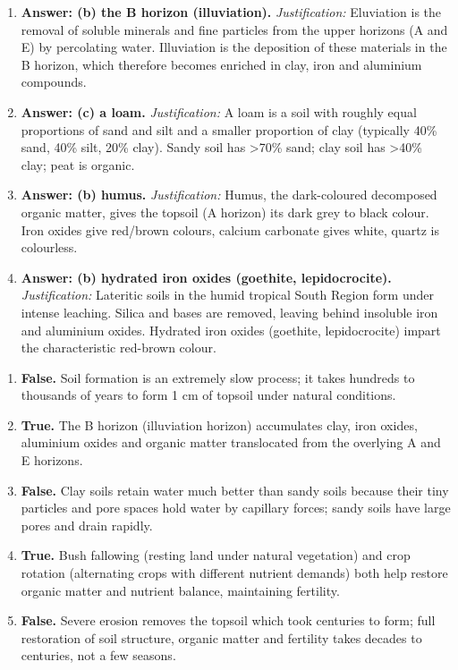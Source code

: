 \documentclass[11pt]{article}
\begin{document}
\begin{corrige}
\begin{enumerate}
\item \textbf{Answer: (b) the B horizon (illuviation).}  
  \textit{Justification:} Eluviation is the removal of soluble minerals and fine particles from the upper horizons (A and E) by percolating water. Illuviation is the deposition of these materials in the B horizon, which therefore becomes enriched in clay, iron and aluminium compounds.

\item \textbf{Answer: (c) a loam.}  
  \textit{Justification:} A loam is a soil with roughly equal proportions of sand and silt and a smaller proportion of clay (typically 40\% sand, 40\% silt, 20\% clay). Sandy soil has >70\% sand; clay soil has >40\% clay; peat is organic.

\item \textbf{Answer: (b) humus.}  
  \textit{Justification:} Humus, the dark-coloured decomposed organic matter, gives the topsoil (A horizon) its dark grey to black colour. Iron oxides give red/brown colours, calcium carbonate gives white, quartz is colourless.

\item \textbf{Answer: (b) hydrated iron oxides (goethite, lepidocrocite).}  
  \textit{Justification:} Lateritic soils in the humid tropical South Region form under intense leaching. Silica and bases are removed, leaving behind insoluble iron and aluminium oxides. Hydrated iron oxides (goethite, lepidocrocite) impart the characteristic red-brown colour.
\end{enumerate}
\end{corrige}

\begin{corrige}
\begin{enumerate}
\item \textbf{False.} Soil formation is an extremely slow process; it takes hundreds to thousands of years to form 1 cm of topsoil under natural conditions.
\item \textbf{True.} The B horizon (illuviation horizon) accumulates clay, iron oxides, aluminium oxides and organic matter translocated from the overlying A and E horizons.
\item \textbf{False.} Clay soils retain water much better than sandy soils because their tiny particles and pore spaces hold water by capillary forces; sandy soils have large pores and drain rapidly.
\item \textbf{True.} Bush fallowing (resting land under natural vegetation) and crop rotation (alternating crops with different nutrient demands) both help restore organic matter and nutrient balance, maintaining fertility.
\item \textbf{False.} Severe erosion removes the topsoil which took centuries to form; full restoration of soil structure, organic matter and fertility takes decades to centuries, not a few seasons.
\end{enumerate}
\end{corrige}
\end{document}
